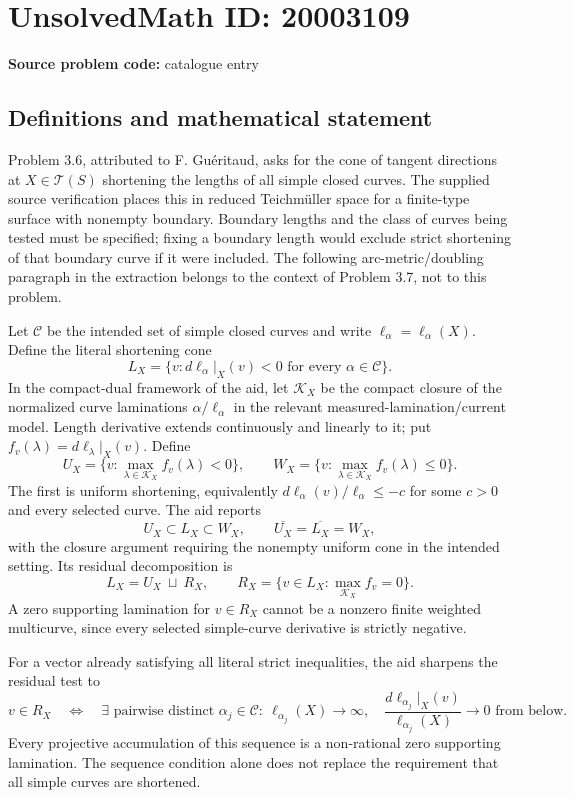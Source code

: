 \documentclass[11pt]{article}
\begin{document}
\section*{UnsolvedMath ID: 20003109}
\textbf{Source problem code:} catalogue entry
\subsection{Definitions and mathematical statement}
Problem 3.6, attributed to F. Gu\'eritaud, asks for the cone of tangent directions at $X\in\mathcal T(S)$ shortening the lengths of all simple closed curves. The supplied source verification places this in reduced Teichm\"uller space for a finite-type surface with nonempty boundary. Boundary lengths and the class of curves being tested must be specified; fixing a boundary length would exclude strict shortening of that boundary curve if it were included. The following arc-metric/doubling paragraph in the extraction belongs to the context of Problem 3.7, not to this problem.

Let $\mathscr C$ be the intended set of simple closed curves and write $\ell_\alpha=\ell_\alpha(X)$. Define the literal shortening cone
\[
 L_X=\{v:d\ell_\alpha|_X(v)<0\text{ for every }\alpha\in\mathscr C\}.
\]
In the compact-dual framework of the aid, let $\mathscr K_X$ be the compact closure of the normalized curve laminations $\alpha/\ell_\alpha$ in the relevant measured-lamination/current model. Length derivative extends continuously and linearly to it; put $f_v(\lambda)=d\ell_\lambda|_X(v)$. Define
\[
 U_X=\{v:\max_{\lambda\in\mathscr K_X}f_v(\lambda)<0\},
 \qquad
 W_X=\{v:\max_{\lambda\in\mathscr K_X}f_v(\lambda)\leq0\}.
\]
The first is uniform shortening, equivalently $d\ell_\alpha(v)/\ell_\alpha\leq-c$ for some $c>0$ and every selected curve. The aid reports
\[
 U_X\subset L_X\subset W_X,\qquad
 \overline{U_X}=\overline{L_X}=W_X,
\]
with the closure argument requiring the nonempty uniform cone in the intended setting. Its residual decomposition is
\[
 L_X=U_X\ \sqcup\ R_X,\qquad
 R_X=\{v\in L_X:\max_{\mathscr K_X}f_v=0\}.
\]
A zero supporting lamination for $v\in R_X$ cannot be a nonzero finite weighted multicurve, since every selected simple-curve derivative is strictly negative.

For a vector already satisfying all literal strict inequalities, the aid sharpens the residual test to
\[
 v\in R_X\quad\Longleftrightarrow\quad
 \exists\text{ pairwise distinct }\alpha_j\in\mathscr C:
 \ \ell_{\alpha_j}(X)\to\infty,\quad
 \frac{d\ell_{\alpha_j}|_X(v)}{\ell_{\alpha_j}(X)}\to0\text{ from below}.
\]
Every projective accumulation of this sequence is a non-rational zero supporting lamination. The sequence condition alone does not replace the requirement that all simple curves are shortened.
\end{document}
